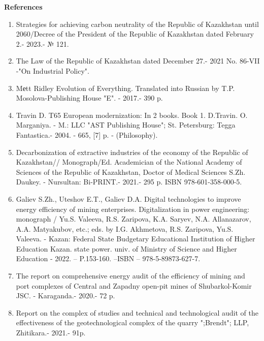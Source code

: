 \newpage

\begin{center}
{\bfseries References}
\end{center}

\begin{enumerate}
\item
Strategies for achieving carbon neutrality of the Republic of
Kazakhstan until 2060/Decree of the President of the Republic of
Kazakhstan dated February 2.- 2023.- № 121.

\item
The Law of the Republic of Kazakhstan dated December 27.- 2021 No.
86-VII -"On Industrial Policy".

\item
Mеtt Ridley Evolution of Everything. Translated into Russian by T.P.
Mosolova-Publishing House "E". - 2017.- 390 p.

\item
Travin D. T65 European modernization: In 2 books. Book 1. D.Travin.
O. Marganiya. - M.: LLC "AST Publishing House"; St. Petersburg: Tegga
Fantastica.- 2004. - 665, {[}7{]} p. - (Philosophy).

\item
Decarbonization of extractive industries of the economy of the
Republic of Kazakhstan// Monograph/Ed. Academician of the National
Academy of Sciences of the Republic of Kazakhstan, Doctor of Medical
Sciences S.Zh. Daukey. - Nursultan: Bi-PRINT.- 2021.- 295 p. ISBN
978-601-358-000-5.

\item
Galiev S.Zh., Uteshov E.T., Galiev D.A. Digital technologies to improve energy efficiency of
mining enterprises. Digitalization in power engineering: monograph / Yu.S. Valeeva, R.S.
Zaripova, K.A. Saryev, N.A. Allanazarov, A.A. Matyakubov, etc.; eds. by I.G. Akhmetova, R.S.
Zaripova, Yu.S. Valeeva. - Kazan: Federal State Budgetary Educational Institution of Higher
Education Kazan. state power. univ. of Ministry of Science and Higher Education - 2022. –
P.153-160. –ISBN – 978-5-89873-627-7.

\item
The report on comprehensive energy audit of the efficiency of mining and port complexes of
Central and Zapadny open-pit mines of Shubarkol-Komir JSC. - Karaganda.- 2020.- 72 p.

\item
Report on the complex of studies and technical and technological audit of the effectiveness of
the geotechnological complex of the quarry ";Brendt"; LLP, Zhitikara.- 2021.- 91p.


\end{enumerate}
